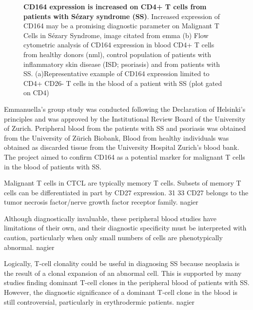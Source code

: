 \begin{figure}[t]
\begin{center}
\begin{subfigure}[b]{0.49\textwidth}
			\label{fig:cellnet}
            \caption{}
		\end{subfigure}
	\end{center}
	\caption{\textbf{CD164 expression is increased on CD4+ T cells from patients with Sézary syndrome (SS)}.  Increased expression of CD164 may be a promising diagnostic parameter on Malignant T Cells in Sézary Syndrome, image citated from emma
(b) Flow cytometric analysis of CD164 expression in blood CD4+ T cells from healthy donors (nml), control population of patients with inflammatory skin disease (ISD; psoriasis) and from patients with SS. (a)Representative example of CD164 expression limited to CD4+ CD26- T cells in the blood of a patient with SS (plot gated on CD4)}
\end{figure}

Emmanuella's group study was conducted following the Declaration of Helsinki's principles and was approved by the Institutional Review Board of the University of Zurich.  Peripheral blood from the patients with SS and psoriasis was obtained from the University of Zürich Biobank, Blood from healthy individuals was obtained as discarded tissue from the University Hospital Zurich's blood bank. The project aimed to confirm CD164 as a potential marker for malignant T cells in the blood of patients with SS.

Malignant T cells in CTCL are typically memory T cells. Subsets of memory T cells can be differentiated in part by CD27 expression. 31 33 CD27 belongs to the tumor necrosis factor/nerve growth factor receptor family. nagier

Although diagnostically invaluable, these peripheral blood studies have limitations of their own, and their diagnostic specificity must be interpreted with caution, particularly when only small numbers of cells are phenotypically abnormal.    nagier


Logically, T-cell clonality could be useful in diagnosing SS because neoplasia is the result of a clonal expansion of an abnormal cell. This is supported by many studies finding dominant T-cell clones in the peripheral blood of patients with SS. However, the diagnostic significance of a dominant T-cell clone in the blood is still controversial, particularly in erythrodermic patients. nagier


